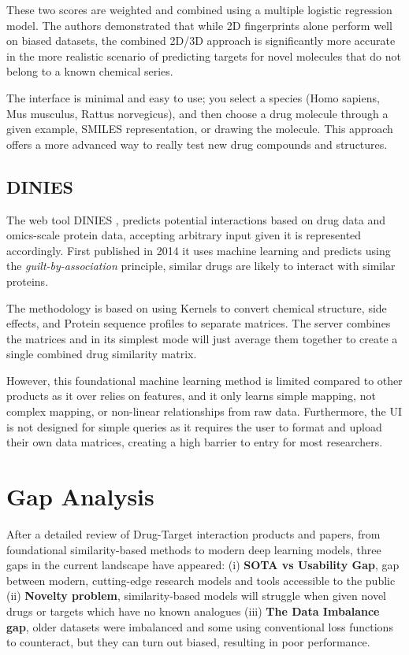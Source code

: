 These two scores are weighted and combined using a multiple logistic regression model.
The authors demonstrated that while 2D fingerprints alone perform well on biased datasets, the combined 2D/3D approach is significantly more accurate in the more realistic scenario of predicting targets for novel molecules that do not belong to a known chemical series.

The interface is minimal and easy to use; you select a species (Homo sapiens, Mus musculus, Rattus norvegicus), and then choose a drug molecule through a given example, SMILES representation, or drawing the molecule.
This approach offers a more advanced way to really test new drug compounds and structures.



\subsection{DINIES}

The web tool DINIES \citep{Yamanishi2014,DINIES_web}, predicts potential interactions based on drug data and omics-scale protein data, accepting arbitrary input given it is represented accordingly.
First published in 2014 it uses machine learning and predicts using the \textit{guilt-by-association} principle, similar drugs are likely to interact with similar proteins.

The methodology is based on using Kernels to convert chemical structure, side effects, and Protein sequence profiles to separate matrices.
The server combines the matrices and in its simplest mode will just average them together to create a single combined drug similarity matrix.

However, this foundational machine learning method is limited compared to other products as it over relies on features, and it only learns simple mapping, not complex mapping, or non-linear relationships from raw data.
Furthermore, the UI is not designed for simple queries as it requires the user to format and upload their own data matrices, creating a high barrier to entry for most researchers.


\section{Gap Analysis}
After a detailed review of Drug-Target interaction products and papers, from foundational similarity-based methods to modern deep learning models, three gaps in the current landscape have appeared: (i) \textbf{SOTA vs Usability Gap}, gap between modern, cutting-edge research models and tools accessible to the public (ii) \textbf{Novelty problem}, similarity-based models will struggle when given novel drugs or targets which have no known analogues (iii) \textbf{The Data Imbalance gap}, older datasets were imbalanced and some using conventional loss functions to counteract, but they can turn out biased, resulting in poor performance.

